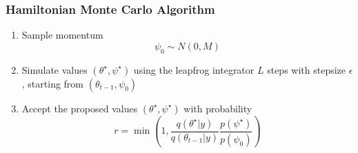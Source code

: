 \documentclass[10pt]{beamer}
\begin{document}
\begin{frame}

\frametitle{Hamiltonian Monte Carlo Algorithm}

\begin{enumerate}
\item Sample momentum
\[
\psi_0 \sim N(0,M)
\]
\pause
\item Simulate values $(\theta^\star,\psi^\star)$ using the leapfrog integrator $L$ steps with stepsize $\epsilon$, starting from $(\theta_{t-1},\psi_0)$
\pause
\item Accept the proposed values $(\theta^\star,\psi^\star)$ with probability
\[
r = \min \left( 1, \frac{q(\theta^\star|y)}{q(\theta_{t-1}|y)}\frac{p(\psi^\star)}{p(\psi_0)} \right)
\]
\end{enumerate}
\end{frame}
\end{document}
